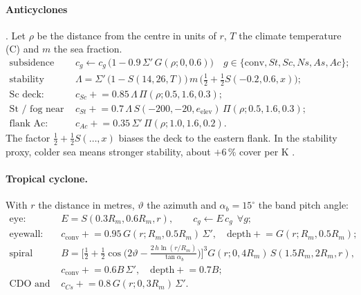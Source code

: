 \documentclass[11pt,a4paper]{article}
\begin{document}
\paragraph{Anticyclones} \cite{wood2012,klein1993}. Let $\rho$ be the distance from the centre in
units of $r$, $T$ the climate temperature (\textdegree C) and $m$ the sea fraction.
\begin{align}
  \text{subsidence clearing:}\quad & c_g\leftarrow c_g\,\big(1-0.9\,\Sigma'\,G(\rho;0,0.6)\big)
     \quad g\in\{\mathrm{conv},St,Sc,Ns,As,Ac\};\\
  \text{stability proxy:}\quad & \Lambda=\Sigma'\,\big(1-S(14,26,T)\big)\,m\,
     \Big(\tfrac12+\tfrac12 S(-0.2,0.6,x)\Big);\\
  \text{Sc deck:}\quad & c_{Sc}\mathrel{+}=0.85\,\Lambda\,\Pi(\rho;0.5,1.6,0.3);\\
  \text{St / fog near the coast:}\quad & c_{St}\mathrel{+}=0.7\,\Lambda\,
     S(-200,-20,e_{\mathrm{elev}})\,\Pi(\rho;0.5,1.6,0.3);\\
  \text{flank Ac:}\quad & c_{Ac}\mathrel{+}=0.35\,\Sigma'\,\Pi(\rho;1.0,1.6,0.2).
\end{align}
The factor $\frac12+\frac12S(\dots,x)$ biases the deck to the eastern flank. In the stability
proxy, colder sea means stronger stability, about $+6\,\%$ cover per K \cite{klein1993}.

\paragraph{Tropical cyclone.} With $r$ the distance in metres, $\vartheta$ the azimuth and
$\alpha_b=15^\circ$ the band pitch angle:
\begin{align}
  \text{eye:}\quad & E=S(0.3R_m,0.6R_m,r),\qquad c_g\leftarrow E\,c_g\ \ \forall g;\\
  \text{eyewall:}\quad & c_{\mathrm{conv}}\mathrel{+}=0.95\,G(r;R_m,0.5R_m)\,\Sigma',\quad
     \mathrm{depth}\mathrel{+}=G(r;R_m,0.5R_m);\\
  \text{spiral bands:}\quad & B=\Big[\tfrac12+\tfrac12\cos\!\Big(2\vartheta-
     \frac{2\,h\ln(r/R_m)}{\tan\alpha_b}\Big)\Big]^3G(r;0,4R_m)\,S(1.5R_m,2R_m,r),\\
  & c_{\mathrm{conv}}\mathrel{+}=0.6B\,\Sigma',\quad \mathrm{depth}\mathrel{+}=0.7B;\\
  \text{CDO and outflow:}\quad & c_{Cs}\mathrel{+}=0.8\,G(r;0,3R_m)\,\Sigma'.
\end{align}
\end{document}
